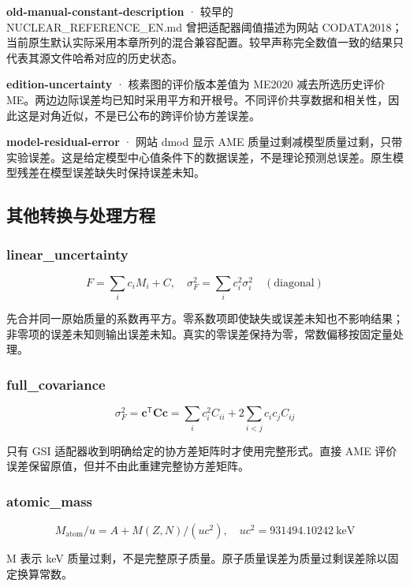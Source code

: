 \documentclass[
  11pt,
  letterpaper,
]{article}
\begin{document}
\textbf{old-manual-constant-description} · 较早的
NUCLEAR\_REFERENCE\_EN.md 曾把适配器阈值描述为网站
CODATA2018；当前原生默认实际采用本章所列的混合兼容配置。较早声称完全数值一致的结果只代表其源文件哈希对应的历史状态。

\textbf{edition-uncertainty} · 核素图的评价版本差值为 ME2020
减去所选历史评价
ME。两边边际误差均已知时采用平方和开根号。不同评价共享数据和相关性，因此这是对角近似，不是已公布的跨评价协方差误差。

\textbf{model-residual-error} · 网站 dmod 显示 AME
质量过剩减模型质量过剩，只带实验误差。这是给定模型中心值条件下的数据误差，不是理论预测总误差。原生模型残差在模型误差缺失时保持误差未知。

\subsection{其他转换与处理方程}\label{ux5176ux4ed6ux8f6cux6362ux4e0eux5904ux7406ux65b9ux7a0b}

\subsubsection{linear\_uncertainty}\label{linear_uncertainty}

\[
F=\sum_i c_i M_i+C,\quad \sigma_F^2=\sum_i c_i^2\sigma_i^2\quad(\mathrm{diagonal})
\]

先合并同一原始质量的系数再平方。零系数项即使缺失或误差未知也不影响结果；非零项的误差未知则输出误差未知。真实的零误差保持为零，常数偏移按固定量处理。

\subsubsection{full\_covariance}\label{full_covariance}

\[
\sigma_F^2=\boldsymbol c^\mathsf{T}\mathbf C\boldsymbol c=\sum_i c_i^2C_{ii}+2\sum_{i<j}c_ic_jC_{ij}
\]

只有 GSI 适配器收到明确给定的协方差矩阵时才使用完整形式。直接 AME
评价误差保留原值，但并不由此重建完整协方差矩阵。

\subsubsection{atomic\_mass}\label{atomic_mass}

\[
M_{\mathrm{atom}}/u=A+M(Z,N)/(u c^2),\quad u c^2=931494.10242\ {\mathrm{keV}}
\]

M 表示 keV
质量过剩，不是完整原子质量。原子质量误差为质量过剩误差除以固定换算常数。
\end{document}
